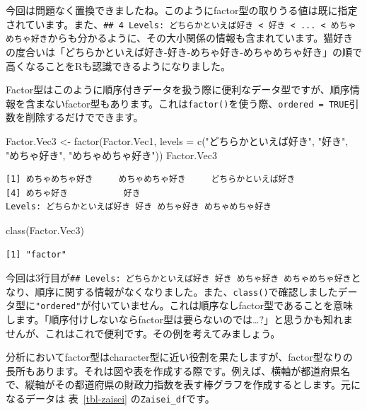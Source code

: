 \documentclass[
  a4paper,
  pandoc,
  ja=standard,
  jafont=haranoaji]{bxjsbook}
\newenvironment{Shaded}{\begin{snugshade}}{\end{snugshade}}
\newcommand{\AttributeTok}[1]{\textcolor[rgb]{0.00,0.48,0.65}{#1}}
\newcommand{\FunctionTok}[1]{\textcolor[rgb]{0.28,0.35,0.67}{#1}}
\newcommand{\NormalTok}[1]{\textcolor[rgb]{0.00,0.48,0.65}{#1}}
\newcommand{\OtherTok}[1]{\textcolor[rgb]{0.00,0.48,0.65}{#1}}
\newcommand{\StringTok}[1]{\textcolor[rgb]{0.13,0.47,0.30}{#1}}
\begin{document}
今回は問題なく置換できましたね。このようにfactor型の取りうる値は既に指定されています。また、\texttt{\#\#\ 4\ Levels:\ どちらかといえば好き\ \textless{}\ 好き\ \textless{}\ ...\ \textless{}\ めちゃめちゃ好き}からも分かるように、その大小関係の情報も含まれています。猫好きの度合いは「どちらかといえば好き-好き-めちゃ好き-めちゃめちゃ好き」の順で高くなることをRも認識できるようになりました。

Factor型はこのように順序付きデータを扱う際に便利なデータ型ですが、順序情報を含まないfactor型もあります。これは\texttt{factor()}を使う際、\texttt{ordered\ =\ TRUE}引数を削除するだけでできます。

\begin{Shaded}
\begin{Highlighting}[numbers=left,,]
\NormalTok{Factor.Vec3 }\OtherTok{\textless{}{-}} \FunctionTok{factor}\NormalTok{(Factor.Vec1,}
                      \AttributeTok{levels =} \FunctionTok{c}\NormalTok{(}\StringTok{"どちらかといえば好き"}\NormalTok{, }\StringTok{"好き"}\NormalTok{,}
                                 \StringTok{"めちゃ好き"}\NormalTok{, }\StringTok{"めちゃめちゃ好き"}\NormalTok{))}
\NormalTok{Factor.Vec3}
\end{Highlighting}
\end{Shaded}

\begin{verbatim}
[1] めちゃめちゃ好き     めちゃめちゃ好き     どちらかといえば好き
[4] めちゃ好き           好き                
Levels: どちらかといえば好き 好き めちゃ好き めちゃめちゃ好き
\end{verbatim}

\begin{Shaded}
\begin{Highlighting}[numbers=left,,]
\FunctionTok{class}\NormalTok{(Factor.Vec3)}
\end{Highlighting}
\end{Shaded}

\begin{verbatim}
[1] "factor"
\end{verbatim}

今回は3行目が\texttt{\#\#\ Levels:\ どちらかといえば好き\ 好き\ めちゃ好き\ めちゃめちゃ好き}となり、順序に関する情報がなくなりました。また、\texttt{class()}で確認しましたデータ型に\texttt{"ordered"}が付いていません。これは順序なしfactor型であることを意味します。「順序付けしないならfactor型は要らないのでは\ldots?」と思うかも知れませんが、これはこれで便利です。その例を考えてみましょう。

分析においてfactor型はcharacter型に近い役割を果たしますが、factor型なりの長所もあります。それは図や表を作成する際です。例えば、横軸が都道府県名で、縦軸がその都道府県の財政力指数を表す棒グラフを作成するとします。元になるデータは
表~\ref{tbl-zaisei} の\texttt{Zaisei\_df}です。
\end{document}
